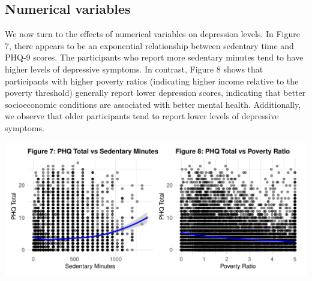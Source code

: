 \documentclass[
  11pt,
]{article}
\begin{document}
\begin{table}[!h]
\centering
\caption{\label{tab:table}Summary Statistics of PHQ9 Scores}
\centering
{}
\end{table}

\subsection{Numerical variables}\label{numerical-variables}

We now turn to the effects of numerical variables on depression levels. In Figure 7, there appears to be an exponential relationship between sedentary time and PHQ-9 scores. The participants who report more sedentary minutes tend to have higher levels of depressive symptoms. In contrast, Figure 8 shows that participants with higher poverty ratios (indicating higher income relative to the poverty threshold) generally report lower depression scores, indicating that better socioeconomic conditions are associated with better mental health. Additionally, we observe that older participants tend to report lower levels of depressive symptoms.

\includegraphics{report_files/figure-latex/plot_sedentary_poverty-1.pdf}
\end{document}
